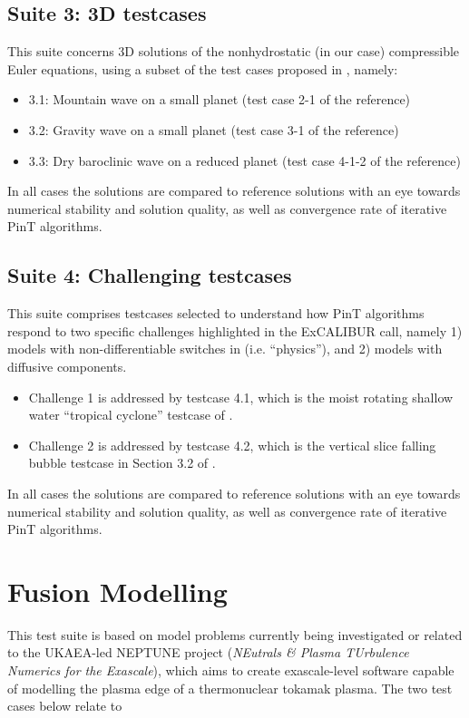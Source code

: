 \documentclass{article}
\begin{document}
\subsection{Suite 3: 3D testcases}
This suite concerns 3D solutions of the nonhydrostatic (in our case)
compressible Euler equations, using a subset of the test cases proposed
in \citet{ullrich2012dynamical}, namely:
\begin{itemize}
\item 3.1: Mountain wave on a small planet (test case 2-1 of the reference)
\item 3.2: Gravity wave on a small planet (test case 3-1 of the reference)
\item 3.3: Dry baroclinic wave on a reduced planet (test case 4-1-2 of
  the reference)
\end{itemize}
In all cases the solutions are compared to reference solutions with an
eye towards numerical stability and solution quality, as well as
convergence rate of iterative PinT algorithms.

\subsection{Suite 4: Challenging testcases}
This suite comprises testcases selected to understand how PinT
algorithms respond to two specific challenges highlighted in the
ExCALIBUR call, namely 1) models with non-differentiable switches in
(i.e. ``physics''), and 2) models with diffusive components.
\begin{itemize}
\item Challenge 1 is addressed by testcase 4.1, which is the moist rotating
shallow water ``tropical cyclone'' testcase of \citet{ferguson2019assessing}.
\item Challenge 2 is addressed by testcase 4.2, which is the vertical slice
falling bubble testcase in Section 3.2 of \citet{cotter2022compatible}.
\end{itemize}

In all cases the solutions are compared to reference solutions with an
eye towards numerical stability and solution quality, as well as
convergence rate of iterative PinT algorithms.

\section{Fusion Modelling}

This test suite is based on model problems currently being
investigated or related to the UKAEA-led NEPTUNE project
(\emph{NEutrals \& Plasma TUrbulence Numerics for the Exascale}),
which aims to create exascale-level software capable of modelling the
plasma edge of a thermonuclear tokamak plasma. The two test cases
below relate to
\end{document}
